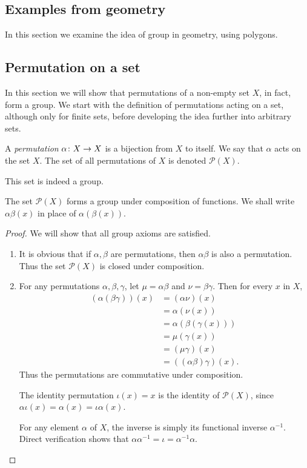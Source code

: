\documentclass[main.tex]{subfiles}
\begin{document}
	\subsection{Examples from geometry}
		In this section we examine the idea of group in geometry, using polygons.
		
		
	\subsection{Permutation on a set}
				In this section we will show that permutations of a non-empty set $X$, in fact, form a group. 
				We start with the definition of permutations acting on a set, although only for finite sets, before developing the idea further into arbitrary sets.
				
				\begin{definition}
					A \textit{permutation} $\alpha \colon X \rightarrow X$ is a bijection from $X$ to itself. We say that $\alpha$ acts on the set $X$. The set of all permutations of $X$ is denoted $\mathcal{P}(X)$.				
				\end{definition}
				This set is indeed a group.
				\begin{theorem}
					The set $\mathcal{P}(X)$ forms a group under composition of functions. We shall write $\alpha\beta(x)$ in place of $\alpha(\beta(x))$.
				\end{theorem}
				\begin{proof}
					We will show that all group axioms are satisfied.
					\begin{enumerate}
						\item It is obvious that if $\alpha, \beta$ are permutations, then $\alpha\beta$ is also a permutation. Thus the set $\mathcal{P}(X)$ is closed under composition.
						
						\item For any permutations $\alpha, \beta, \gamma$, let $\mu = \alpha\beta$ and $\nu = \beta\gamma$. Then for every $x$ in $X$,
						\begin{equation}
						\begin{aligned}
							(\alpha(\beta\gamma))(x) & = (\alpha\nu)(x) \\
									& = \alpha(\nu(x))	\\
									& = \alpha(\beta(\gamma(x))) \\
									& = \mu(\gamma(x))	\\
									& = (\mu\gamma)(x) \\
									& = ((\alpha\beta)\gamma)(x).
						\end{aligned}
						\end{equation}
						Thus the permutations are commutative under composition.
						
						\ii The identity permutation $\iota (x) = x$ is the identity of $\mathcal{P}(X)$, since $\alpha\iota(x) = \alpha(x) = \iota\alpha(x)$.
						
						\ii For any element $\alpha$ of $X$, the inverse is simply its functional inverse $\alpha^{-1}$. Direct verification shows that $\alpha\alpha^{-1} = \iota = \alpha^{-1}\alpha$.
					\end{enumerate}
				\end{proof}
\end{document}
